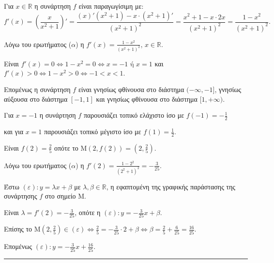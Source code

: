 \begin{alist}
\item Για $x \in \mathbb{R}$ η συνάρτηση $f$ είναι παραγωγίσιμη με:
\[ f'(x) = \left( \frac{x}{x^2+1} \right)' = \frac{(x)'(x^2+1) - x \cdot (x^2+1)'}{(x^2+1)^2} = \frac{x^2+1 - x \cdot 2x}{(x^2+1)^2} = \frac{1-x^2}{(x^2+1)^2}. \]

\item Λόγω του ερωτήματος ($\alpha$) η $f'(x) = \frac{1-x^2}{(x^2+1)^2}$, $x \in \mathbb{R}$.

Είναι $f'(x) = 0 \Leftrightarrow 1-x^2 = 0 \Leftrightarrow x=-1 \text{ ή } x=1$ και $f'(x) > 0 \Leftrightarrow 1-x^2 > 0 \Leftrightarrow -1 < x < 1$.

\begin{center}
\end{center}

Επομένως η συνάρτηση $f$ είναι γνησίως φθίνουσα στο διάστημα $(-\infty,-1]$, γνησίως αύξουσα στο διάστημα $[-1,1]$ και γνησίως φθίνουσα στο διάστημα $[1,+\infty)$.

Για $x=-1$ η συνάρτηση $f$ παρουσιάζει τοπικό ελάχιστο ίσο με $f(-1) = -\frac{1}{2}$

και για $x=1$ παρουσιάζει τοπικό μέγιστο ίσο με $f(1) = \frac{1}{2}$.

\item Είναι $f(2) = \frac{2}{5}$ οπότε το $\mathrm{M}(2, f(2)) = \left(2, \frac{2}{5}\right)$.

Λόγω του ερωτήματος ($\alpha$) η $f'(2) = \frac{1-2^2}{(2^2+1)^2} = -\frac{3}{25}$.

Έστω $(\varepsilon): y = \lambda x + \beta$ με $\lambda,\beta \in \mathbb{R}$, η εφαπτομένη της γραφικής παράστασης της συνάρτησης $f$ στο σημείο $\mathrm{M}$.

Είναι $\lambda = f'(2) = -\frac{3}{25}$, οπότε η $(\varepsilon): y = -\frac{3}{25}x + \beta$.

Επίσης το $\mathrm{M}\left(2, \frac{2}{5}\right) \in (\varepsilon) \Leftrightarrow \frac{2}{5} = -\frac{3}{25} \cdot 2 + \beta \Leftrightarrow \beta = \frac{2}{5} + \frac{6}{25} = \frac{16}{25}$.

Επομένως $(\varepsilon): y = -\frac{3}{25}x + \frac{16}{25}$.
\end{alist}
\vspace{6mm}
\noindent\rule{\textwidth}{0.4pt}
\vspace{6mm}

